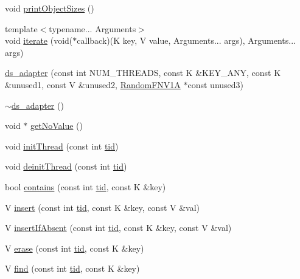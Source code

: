 \begin{DoxyCompactItemize}
\item 
void \hyperlink{classds__adapter_a33b13b7059a8c0345fb59a324dc3a691}{print\+Object\+Sizes} ()
\item 
{\footnotesize template$<$typename... Arguments$>$ }\\void \hyperlink{classds__adapter_ab1e0bb9a9b403ba68e85bf53219b1368}{iterate} (void($\ast$callback)(K key, V value, Arguments... args), Arguments... args)
\item 
\hyperlink{classds__adapter_a553e7a145bf0cdfb14cb9dc25eec03d3}{ds\+\_\+adapter} (const int N\+U\+M\+\_\+\+T\+H\+R\+E\+A\+DS, const K \&K\+E\+Y\+\_\+\+A\+NY, const K \&unused1, const V \&unused2, \hyperlink{classRandomFNV1A}{Random\+F\+N\+V1A} $\ast$const unused3)
\item 
\hyperlink{classds__adapter_a366f46dd39d59f2d4a147589f5fd98e3}{$\sim$ds\+\_\+adapter} ()
\item 
void $\ast$ \hyperlink{classds__adapter_adb631e454b8146520f601d1a86c6c72c}{get\+No\+Value} ()
\item 
void \hyperlink{classds__adapter_a3733f6a6b57312b1b5e4fb5181d82a0b}{init\+Thread} (const int \hyperlink{microbench_2main_8cpp_a9ca9869868fe7e7a38a921cc7de4103f}{tid})
\item 
void \hyperlink{classds__adapter_a173ca48b19fc1dc346159ea582c690cd}{deinit\+Thread} (const int \hyperlink{microbench_2main_8cpp_a9ca9869868fe7e7a38a921cc7de4103f}{tid})
\item 
bool \hyperlink{classds__adapter_aecf1899dbe9fae93c72ee2b5549cf6eb}{contains} (const int \hyperlink{microbench_2main_8cpp_a9ca9869868fe7e7a38a921cc7de4103f}{tid}, const K \&key)
\item 
V \hyperlink{classds__adapter_a6c0fc676d77e30e14946baf325174739}{insert} (const int \hyperlink{microbench_2main_8cpp_a9ca9869868fe7e7a38a921cc7de4103f}{tid}, const K \&key, const V \&val)
\item 
V \hyperlink{classds__adapter_ae9cb29ad0c0338c0e1d12ef97e008135}{insert\+If\+Absent} (const int \hyperlink{microbench_2main_8cpp_a9ca9869868fe7e7a38a921cc7de4103f}{tid}, const K \&key, const V \&val)
\item 
V \hyperlink{classds__adapter_a1bf459e8449df93cc738a644aeffdcfb}{erase} (const int \hyperlink{microbench_2main_8cpp_a9ca9869868fe7e7a38a921cc7de4103f}{tid}, const K \&key)
\item 
V \hyperlink{classds__adapter_a0109b0d011810f687c9e9273eb1d1bc8}{find} (const int \hyperlink{microbench_2main_8cpp_a9ca9869868fe7e7a38a921cc7de4103f}{tid}, const K \&key)
\item 

\end{DoxyCompactItemize}
